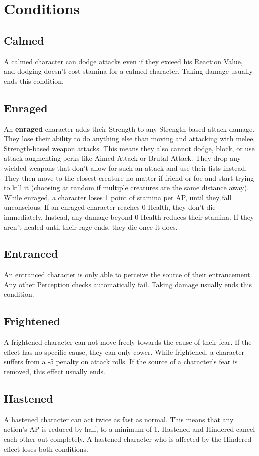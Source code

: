 \chapter{Conditions}

\section{Calmed}
A calmed character can dodge attacks even if they exceed his Reaction Value, and dodging doesn't cost stamina for a calmed character. Taking damage usually ends this condition.

\section{Enraged}
An \textbf{enraged} character adds their Strength to any Strength-based attack damage. They lose their ability to do anything else than moving and attacking with melee, Strength-based weapon attacks. This means they also cannot dodge, block, or use attack-augmenting perks like Aimed Attack or Brutal Attack. They drop any wielded weapons that don't allow for such an attack and use their fists instead. They then move to the closest creature no matter if friend or foe and start trying to kill it (choosing at random if multiple creatures are the same distance away). While enraged, a character loses 1 point of stamina per AP, until they fall unconscious. If an enraged character reaches 0 Health, they don't die immediately. Instead, any damage beyond 0 Health reduces their stamina. If they aren't healed until their rage ends, they die once it does.

\section{Entranced}
An entranced character is only able to perceive the source of their entrancement. Any other Perception checks automatically fail. Taking damage usually ends this condition.

\section{Frightened}
A frightened character can not move freely towards the cause of their fear. If the effect has no specific cause, they can only cower. While frightened, a character suffers from a -5 penalty on attack rolls. If the source of a character's fear is removed, this effect usually ends.

\section{Hastened}
A hastened character can act twice as fast as normal. This means that any action's AP is reduced by half, to a minimum of 1. Hastened and Hindered cancel each other out completely. A hastened character who is affected by the Hindered effect loses both conditions.

